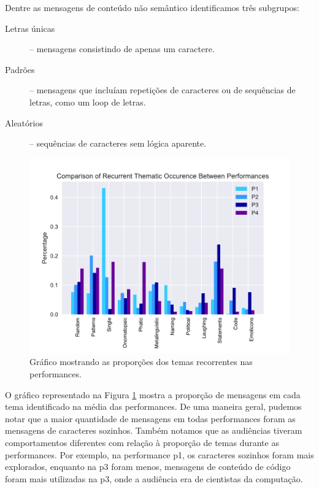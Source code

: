 Dentre as mensagens de conteúdo não semântico identificamos três subgrupos:

\begin{description}
\item[Letras únicas] -- mensagens consistindo de apenas um caractere.
\item[Padrões] -- mensagens que incluíam repetições de caracteres ou de sequências de letras, como um loop de letras.
\item[Aleatórios] -- sequências de caracteres sem lógica aparente.
\end{description}

\begin{figure}
\includegraphics[width=1\linewidth]{pictures/cap3/bar_plot_new_revised}
\caption{Gráfico mostrando as proporções dos temas recorrentes nas performances.}
\label{donut}
\end{figure}

O gráfico representado na Figura \ref{donut} mostra a proporção de mensagens em cada tema identificado na média das performances. De uma maneira geral, pudemos notar que a maior quantidade de mensagens em todas performances foram as mensagens de caracteres sozinhos. Também notamos que as audiências tiveram comportamentos diferentes com relação à proporção de temas durante as performances. Por exemplo, na performance p1, os caracteres sozinhos foram mais explorados, enquanto na p3 foram menos, mensagens de conteúdo de código foram mais utilizadas na p3, onde a audiência era de cientistas da computação.

